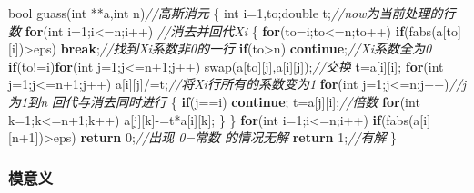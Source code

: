 \documentclass[
]{article}
\newenvironment{Shaded}{}{}
\newcommand{\CommentTok}[1]{\textcolor[rgb]{0.38,0.63,0.69}{\textit{#1}}}
\newcommand{\ControlFlowTok}[1]{\textcolor[rgb]{0.00,0.44,0.13}{\textbf{#1}}}
\newcommand{\DataTypeTok}[1]{\textcolor[rgb]{0.56,0.13,0.00}{#1}}
\newcommand{\DecValTok}[1]{\textcolor[rgb]{0.25,0.63,0.44}{#1}}
\newcommand{\NormalTok}[1]{#1}
\begin{document}
\begin{Shaded}
\begin{Highlighting}[]
\DataTypeTok{bool}\NormalTok{ guass(}\DataTypeTok{int}\NormalTok{ **a,}\DataTypeTok{int}\NormalTok{ n)}\CommentTok{//高斯消元}
\NormalTok{\{}
    \DataTypeTok{int}\NormalTok{ i=}\DecValTok{1}\NormalTok{,to;}\DataTypeTok{double}\NormalTok{ t;}\CommentTok{//now为当前处理的行数}
    \ControlFlowTok{for}\NormalTok{(}\DataTypeTok{int}\NormalTok{ i=}\DecValTok{1}\NormalTok{;i\textless{}=n;i++) }\CommentTok{//消去并回代Xi}
\NormalTok{    \{}
        \ControlFlowTok{for}\NormalTok{(to=i;to\textless{}=n;to++)}
            \ControlFlowTok{if}\NormalTok{(fabs(a[to][i])\textgreater{}eps) }\ControlFlowTok{break}\NormalTok{;}\CommentTok{//找到Xi系数非0的一行}
        \ControlFlowTok{if}\NormalTok{(to\textgreater{}n) }\ControlFlowTok{continue}\NormalTok{;}\CommentTok{//Xi系数全为0}
        \ControlFlowTok{if}\NormalTok{(to!=i)}\ControlFlowTok{for}\NormalTok{(}\DataTypeTok{int}\NormalTok{ j=}\DecValTok{1}\NormalTok{;j\textless{}=n+}\DecValTok{1}\NormalTok{;j++)}
\NormalTok{            swap(a[to][j],a[i][j]);}\CommentTok{//交换}
\NormalTok{        t=a[i][i];}
        \ControlFlowTok{for}\NormalTok{(}\DataTypeTok{int}\NormalTok{ j=}\DecValTok{1}\NormalTok{;j\textless{}=n+}\DecValTok{1}\NormalTok{;j++) a[i][j]/=t;}\CommentTok{//将Xi行所有的系数变为1}
        \ControlFlowTok{for}\NormalTok{(}\DataTypeTok{int}\NormalTok{ j=}\DecValTok{1}\NormalTok{;j\textless{}=n;j++)}\CommentTok{//j为1到n 回代与消去同时进行}
\NormalTok{        \{}
            \ControlFlowTok{if}\NormalTok{(j==i) }\ControlFlowTok{continue}\NormalTok{;}
\NormalTok{            t=a[j][i];}\CommentTok{//倍数}
            \ControlFlowTok{for}\NormalTok{(}\DataTypeTok{int}\NormalTok{ k=}\DecValTok{1}\NormalTok{;k\textless{}=n+}\DecValTok{1}\NormalTok{;k++)}
\NormalTok{                a[j][k]{-}=t*a[i][k];}
\NormalTok{        \}}
\NormalTok{    \}}
    \ControlFlowTok{for}\NormalTok{(}\DataTypeTok{int}\NormalTok{ i=}\DecValTok{1}\NormalTok{;i\textless{}=n;i++)}
        \ControlFlowTok{if}\NormalTok{(fabs(a[i][n+}\DecValTok{1}\NormalTok{])\textgreater{}eps) }\ControlFlowTok{return} \DecValTok{0}\NormalTok{;}\CommentTok{//出现 0=常数 的情况无解}
    \ControlFlowTok{return} \DecValTok{1}\NormalTok{;}\CommentTok{//有解}
\NormalTok{\}}
\end{Highlighting}
\end{Shaded}

\hypertarget{ux6a21ux610fux4e49}{%
\subsubsection{模意义}\label{ux6a21ux610fux4e49}}
\end{document}
